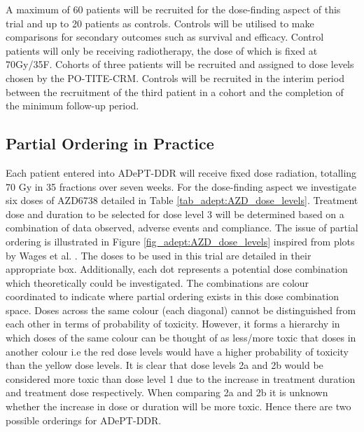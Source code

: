 A maximum of 60 patients will be recruited for the dose-finding aspect of this trial and up to 20 patients as controls. Controls will be utilised to make comparisons for secondary outcomes such as survival and efficacy. Control patients will only be receiving radiotherapy, the dose of which is fixed at 70Gy/35F. Cohorts of three patients will be recruited and assigned to dose levels chosen by the PO-TITE-CRM. Controls will be recruited in the interim period between the recruitment of the third patient in a cohort and the completion of the minimum follow-up period.    

\subsection{Partial Ordering in Practice}
\label{adept:Partial-ordering-in-practice}%

Each patient entered into ADePT-DDR will receive fixed dose radiation, totalling 70 Gy in 35 fractions over seven weeks. For the dose-finding aspect we investigate six doses of AZD6738 detailed in Table \ref{tab_adept:AZD_dose_levels}. Treatment dose and duration to be selected for dose level 3 will be determined based on a combination of data observed, adverse events and compliance. The issue of partial ordering is illustrated in Figure \ref{fig_adept:AZD_dose_levels} inspired from plots by Wages et al. \cite{wagesUsingTimetoeventContinual2013}. The doses to be used in this trial are detailed in their appropriate box. Additionally, each dot represents a potential dose combination which theoretically could be investigated. The combinations are colour coordinated to indicate where partial ordering exists in this dose combination space. Doses across the same colour (each diagonal) cannot be distinguished from each other in terms of probability of toxicity. However, it forms a hierarchy in which doses of the same colour can be thought of as less/more toxic that doses in another colour i.e the red dose levels would have a higher probability of toxicity than the yellow dose levels. It is clear that dose levels 2a and 2b would be considered more toxic than dose level 1 due to the increase in treatment duration and treatment dose respectively. When comparing 2a and 2b it is unknown whether the increase in dose or duration will be more toxic. Hence there are two possible orderings for ADePT-DDR. 


